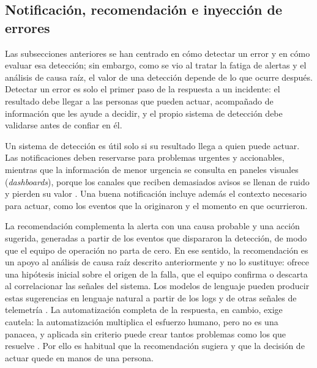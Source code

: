 \subsection{Notificación, recomendación e inyección de errores}\label{sec:mt_reaccion}

Las subsecciones anteriores se han centrado en cómo detectar un error y en cómo evaluar esa detección; sin embargo, como se vio al tratar la fatiga de alertas y el análisis de causa raíz, el valor de una detección depende de lo que ocurre después. Detectar un error es solo el primer paso de la respuesta a un incidente: el resultado debe llegar a las personas que pueden actuar, acompañado de información que les ayude a decidir, y el propio sistema de detección debe validarse antes de confiar en él.

Un sistema de detección es útil solo si su resultado llega a quien puede actuar. Las notificaciones deben reservarse para problemas urgentes y accionables, mientras que la información de menor urgencia se consulta en paneles visuales (\textit{dashboards}), porque los canales que reciben demasiados avisos se llenan de ruido y pierden su valor \cite{ewaschuk2016_sre_monitoring}. Una buena notificación incluye además el contexto necesario para actuar, como los eventos que la originaron y el momento en que ocurrieron.

La recomendación complementa la alerta con una causa probable y una acción sugerida, generadas a partir de los eventos que dispararon la detección, de modo que el equipo de operación no parta de cero. En ese sentido, la recomendación es un apoyo al análisis de causa raíz descrito anteriormente y no lo sustituye: ofrece una hipótesis inicial sobre el origen de la falla, que el equipo confirma o descarta al correlacionar las señales del sistema. Los modelos de lenguaje pueden producir estas sugerencias en lenguaje natural a partir de los logs y de otras señales de telemetría \cite{wang2025_cloudnative_rca}. La automatización completa de la respuesta, en cambio, exige cautela: la automatización multiplica el esfuerzo humano, pero no es una panacea, y aplicada sin criterio puede crear tantos problemas como los que resuelve \cite{murphy2016_sre_automation}. Por ello es habitual que la recomendación sugiera y que la decisión de actuar quede en manos de una persona.

